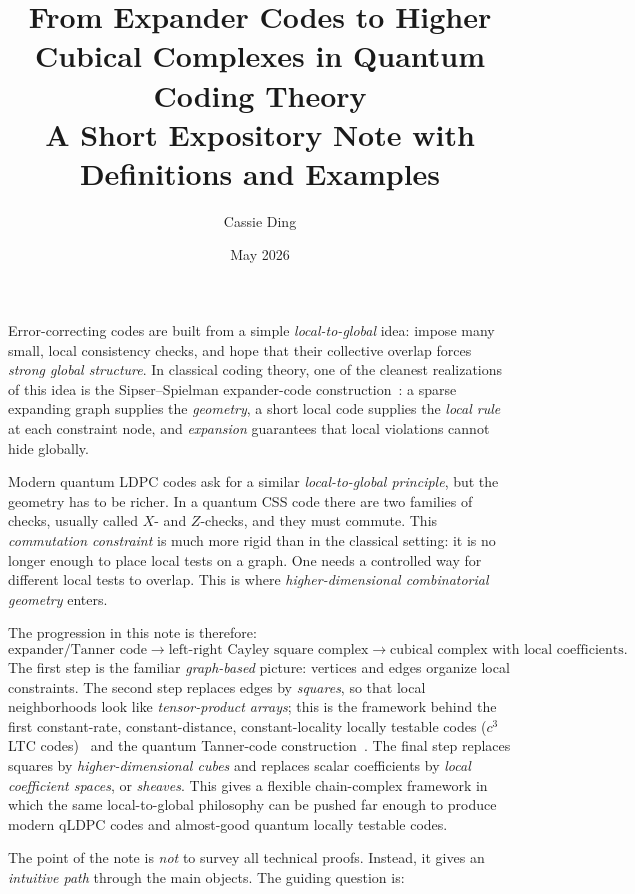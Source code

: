\documentclass[10pt]{article}
\title{From Expander Codes to Higher Cubical Complexes in Quantum Coding Theory\\
\large A Short Expository Note with Definitions and Examples}
\author{Cassie Ding}
\date{May 2026}
\theoremstyle{compactdef}
\begin{document}
\maketitle
\vspace*{-0.8em}

Error-correcting codes are built from a simple \emph{local-to-global} idea: impose many small, local consistency checks, and hope that their collective overlap forces \emph{strong global structure}. In classical coding theory, one of the cleanest realizations of this idea is the Sipser--Spielman expander-code construction~\cite{SS}: a sparse expanding graph supplies the \emph{geometry}, a short local code supplies the \emph{local rule} at each constraint node, and \emph{expansion} guarantees that local violations cannot hide globally.

Modern quantum LDPC codes ask for a similar \emph{local-to-global principle}, but the geometry has to be richer. In a quantum CSS code there are two families of checks, usually called $X$- and $Z$-checks, and they must commute. This \emph{commutation constraint} is much more rigid than in the classical setting: it is no longer enough to place local tests on a graph. One needs a controlled way for different local tests to overlap. This is where \emph{higher-dimensional combinatorial geometry} enters.

The progression in this note is therefore:
\[
\text{expander/Tanner code}
\longrightarrow
\text{left-right Cayley square complex}
\longrightarrow
\text{cubical complex with local coefficients}.
\]
The first step is the familiar \emph{graph-based} picture: vertices and edges organize local constraints. The second step replaces edges by \emph{squares}, so that local neighborhoods look like \emph{tensor-product arrays}; this is the framework behind the first constant-rate, constant-distance, constant-locality locally testable codes ($c^3$ LTC codes)~\cite{DELLM} and the quantum Tanner-code construction~\cite{QT}. The final step replaces squares by \emph{higher-dimensional cubes} and replaces scalar coefficients by \emph{local coefficient spaces}, or \emph{sheaves}. This gives a flexible chain-complex framework in which the same local-to-global philosophy can be pushed far enough to produce modern qLDPC codes and almost-good quantum locally testable codes.~\cite{DLV}

The point of the note is \emph{not} to survey all technical proofs. Instead, it gives an \emph{intuitive path} through the main objects. The guiding question is:
\end{document}
